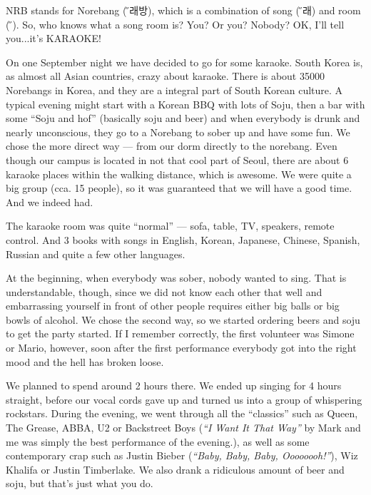 \begin{post}
	\begin{content}
NRB stands for Norebang ({\H 노래방}), which is a combination of song ({\H 노래}) and room ({\H 방}). So, who knows what a song room is? You? Or you? Nobody? OK, I'll tell you...it's KARAOKE!

On one September night we have decided to go for some karaoke. South Korea is, as almost all Asian countries, crazy about karaoke. There is about 35000 Norebangs in Korea, and they are a integral part of South Korean culture. A typical evening might start with a Korean BBQ with lots of Soju, then a bar with some ``Soju and hof'' (basically soju and beer) and when everybody is drunk and nearly unconscious, they go to a Norebang to sober up and have some fun. We chose the more direct way — from our dorm directly to the norebang. Even though our campus is located in not that cool part of Seoul, there are about 6 karaoke places within the walking distance, which is awesome. We were quite a big group (cca. 15 people), so it was guaranteed that we will have a good time. And we indeed had.

The karaoke room was quite ``normal'' --- sofa, table, TV, speakers, remote control. And 3 books with songs in English, Korean, Japanese, Chinese, Spanish, Russian and quite a few other languages.

At the beginning, when everybody was sober, nobody wanted to sing. That is understandable, though, since we did not know each other that well and embarrassing yourself in front of other people requires either big balls or big bowls of alcohol. We chose the second way, so we started ordering beers and soju to get the party started. If I remember correctly, the first volunteer was Simone or Mario, however, soon after the first performance everybody got into the right mood and the hell has broken loose.

We planned to spend around 2 hours there. We ended up singing for 4 hours straight, before our vocal cords gave up and turned us into a group of whispering rockstars. During the evening, we went through all the ``classics'' such as Queen, The Grease, ABBA, U2 or Backstreet Boys (\textit{``I Want It That Way''} by Mark and me was simply the best performance of the evening.), as well as some contemporary crap such as Justin Bieber (\textit{``Baby, Baby, Baby, Oooooooh!''}), Wiz Khalifa or Justin Timberlake. We also drank a ridiculous amount of beer and soju, but that's just what you do.


\end{content}
\end{post}
